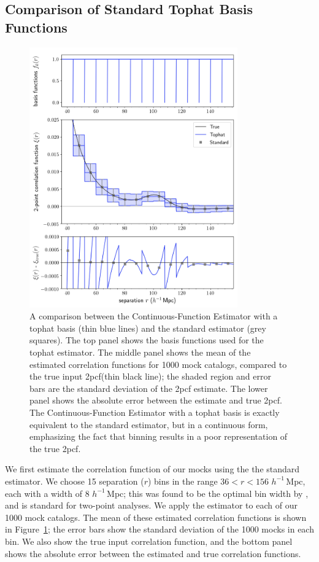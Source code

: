 \documentclass[modern]{aastex62}
\newcommand{\cf}{2pcf\xspace}
\newcommand{\Est}{The Continuous-Function Estimator\xspace}
\newcommand{\est}{the Continuous-Function Estimator\xspace}
\newcommand{\hmpc}{$h^{-1}\,$Mpc}
\begin{document}
\subsection{Comparison of Standard Tophat Basis Functions}

\begin{figure}[ht]
    \centering
    \includegraphics[width=0.8\textwidth]{xicomparison_2e-4_tophat8_theory8}
    \caption{A comparison between \est with a tophat basis (thin blue lines) and the standard estimator (grey squares). The top panel shows the basis functions used for the tophat estimator. The middle panel shows the mean of the estimated correlation functions for 1000 mock catalogs, compared to the true input \cf (thin black line); the shaded region and error bars are the standard deviation of the \cf estimate. The lower panel shows the absolute error between the estimate and true \cf. \Est with a tophat basis is exactly equivalent to the standard estimator, but in a continuous form, emphasizing the fact that binning results in a poor representation of the true \cf.}
    \label{fig:tophat}
\end{figure}
    
We first estimate the correlation function of our mocks using the the standard estimator.
We choose 15 separation ($r$) bins in the range $36 < r < 156$ \hmpc, each with a width of 8 \hmpc; this was found to be the optimal bin width by \cite{Percival2014}, and is standard for two-point analyses.
We apply the estimator to each of our 1000 mock catalogs.
The mean of these estimated correlation functions is shown in Figure~\ref{fig:tophat}; the error bars show the standard deviation of the 1000 mocks in each bin.
We also show the true input correlation function, and the bottom panel shows the absolute error between the estimated and true correlation functions.
\end{document}
